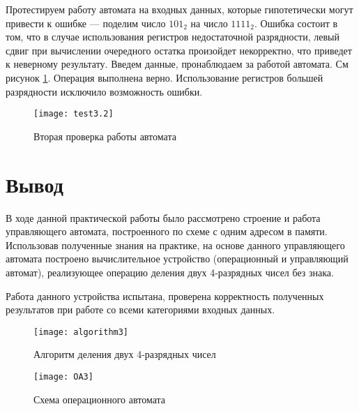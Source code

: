 \documentclass[a4paper,14pt]{extarticle}
\begin{document}
Протестируем работу автомата на входных данных, которые гипотетически могут привести к ошибке --- поделим число $101_2$ на число $1111_2$. Ошибка состоит в том, что в случае использования регистров недостаточной разрядности, левый сдвиг при вычислении очередного остатка произойдет некорректно, что приведет к неверному результату. Введем данные, пронаблюдаем за работой автомата. См рисунок \ref{img:test2}. Операция выполнена верно. Использование регистров большей разрядности исключило возможность ошибки.
\begin{figure}[h!]
	\centering
	\texttt{[image: test3.2]}
	\caption {Вторая проверка работы автомата}
	\label{img:test2}
\end{figure}
\section {Вывод}
В ходе данной практической работы было рассмотрено строение и работа управляющего автомата, построенного по схеме с одним адресом в памяти. Использовав полученные знания на практике, на основе данного управляющего автомата построено вычислительное устройство (операционный и управляющий автомат), реализующее операцию деления двух 4-разрядных чисел без знака.

Работа данного устройства испытана, проверена корректность полученных результатов при работе со всеми категориями входных данных. 

\label{tam}
\begin{figure}[h!]
	\centering
	\texttt{[image: algorithm3]}
	\caption {Алгоритм деления двух 4-разрядных чисел}
	\label{img:algorithm}
\end{figure}
\newpage
\begin{figure}[h!]
	\centering
	\texttt{[image: OA3]}
	\caption {Схема операционного автомата}
	\label{img:oa}
\end{figure}
\end{document}
